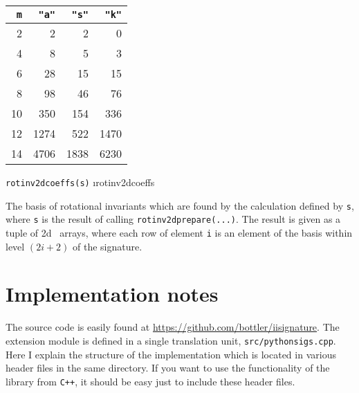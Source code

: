 \documentclass[a4paper]{extarticle}
\newenvironment{defn}{\begin{adjustwidth}{1cm}{}\ignorespaces}{\end{adjustwidth}\ignorespacesafterend}
\begin{document}
\begin{center}
\begin{tabular}{r|rrr}
\verb|m|&\verb|"a"|&\verb|"s"|&\verb|"k"|\\\hline
2&2&2&0\\
4&8&5&3\\
6&28&15&15\\
8&98&46&76\\
10&350&154&336\\
12&1274&522&1470\\
14&4706&1838&6230\\%
\end{tabular}
\end{center}

\verb!rotinv2dcoeffs(s)! \i{rotinv2dcoeffs}
\begin{defn}
	\nopagebreak The basis of rotational invariants which are found by the calculation defined by \verb!s!, where \verb!s! is the result of calling \verb!rotinv2dprepare(...)!. The result is given as a tuple of 2d \numpy\ arrays, where each row of element \verb|i| is an element of the basis within level $(2i+2)$ of the signature.
	\end{defn}

\section{Implementation notes}
The source code is easily found at \url{https://github.com/bottler/iisignature}. The extension module is defined in a single translation unit, \verb|src/pythonsigs.cpp|. Here I explain the structure of the implementation which is located in various header files in the same directory. If you want to use the functionality of the library from \verb!C++!, it should be easy just to include these header files.
\end{document}
